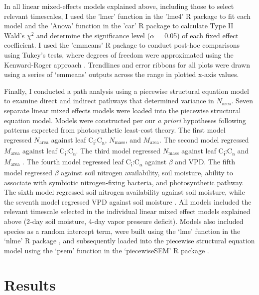 In all linear mixed-effects models explained above, including those to select relevant timescales, I used the 'lmer' function in the 'lme4' R package  to fit each model and the 'Anova' function in the 'car' R package  to calculate Type II Wald's $\chi^2$ and determine the significance level ($\alpha$ = 0.05) of each fixed effect coefficient. I used the 'emmeans' R package  to conduct post-hoc comparisons using Tukey's tests, where degrees of freedom were approximated using the Kenward-Roger approach . Trendlines and error ribbons for all plots were drawn using a series of ‘emmeans’ outputs across the range in plotted x-axis values.

Finally, I conducted a path analysis using a piecewise structural equation model to examine direct and indirect pathways that determined variance in $N_\mathrm{area}$. Seven separate linear mixed effects models were loaded into the piecewise structural equation model. Models were constructed per our \textit{a priori} hypotheses following patterns expected from photosynthetic least-cost theory. The first model regressed $N_\mathrm{area}$ against leaf C\textsubscript{i}:C\textsubscript{a}, $N_\mathrm{mass}$, and $M_\mathrm{area}$. The second model regressed $M_\mathrm{area}$ against leaf C\textsubscript{i}:C\textsubscript{a}. The third model regressed $N_\mathrm{mass}$ against leaf C\textsubscript{i}:C\textsubscript{a} and $M_\mathrm{area}$ . The fourth model regressed leaf C\textsubscript{i}:C\textsubscript{a} against $\beta$ and VPD. The fifth model regressed $\beta$ against soil nitrogen availability, soil moisture, ability to associate with symbiotic nitrogen-fixing bacteria, and photosynthetic pathway. The sixth model regressed soil nitrogen availability against soil moisture, while the seventh model regressed VPD against soil moisture . All models included the relevant timescale selected in the individual linear mixed effect models explained above (2-day soil moisture, 4-day vapor pressure deficit). Models also included species as a random intercept term, were built using the ‘lme’ function in the ‘nlme’ R package , and subsequently loaded into the piecewise structural equation model using the ‘psem’ function in the ‘piecewiseSEM’ R package .

\section{Results}
